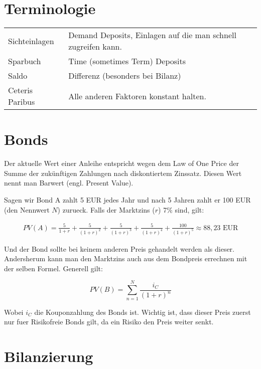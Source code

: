 \documentclass[a4paper]{article}
\begin{document}
\tableofcontents
\pagebreak

\section{
  Terminologie
 }

\begin{table}[htpb]
	\centering
	\label{tab:label}
	\begin{tabular}{ll}
		Sichteinlagen   &
		Demand Deposits, Einlagen auf die man schnell zugreifen kann. \\
		Sparbuch        &
		Time (sometimes Term) Deposits                                \\
		Saldo           &
		Differenz (besonders bei Bilanz)                              \\
		Ceteris Paribus &
		Alle anderen Faktoren konstant halten.                        \\
	\end{tabular}
\end{table}

\section{
  Bonds
 }

Der aktuelle Wert einer Anleihe entspricht wegen dem Law of One Price
der Summe der zukünftigen Zahlungen nach diskontiertem Zinssatz.
Diesen Wert nennt man Barwert (engl. Present Value).

Sagen wir Bond A zahlt 5 EUR jedes Jahr und nach 5 Jahren zahlt er 100 EUR
(den Nennwert $N$) zurueck. Falls der Marktzins ($r$) 7\% sind, gilt:

\begin{align*}
	PV(A) =
	\frac{ 5 }{ 1 + r } +
	\frac{ 5 }{ (1 + r)^{2} } +
	\frac{ 5 }{ (1 + r)^{3} } +
	\frac{ 5 }{ (1 + r)^{4} } +
	\frac{ 100 }{ (1 + r)^{5} }
	\approx 88,23 \text{ EUR}
\end{align*}

Und der Bond sollte bei keinem anderen Preis gehandelt werden als dieser.
Andersherum kann man den Marktzins auch aus dem Bondpreis errechnen mit der
selben Formel. Generell gilt:

\[
	PV(B) = \sum_{n=1}^{N} \frac{ i_C }{ \left(
		1 + r
		\right) ^n }
\]

Wobei $i_C$ die Kouponzahlung des Bonds ist. Wichtig ist, dass dieser Preis
zuerst nur fuer Risikofreie Bonds gilt, da ein Risiko den Preis weiter senkt.

\section{
  Bilanzierung
 }
\end{document}
